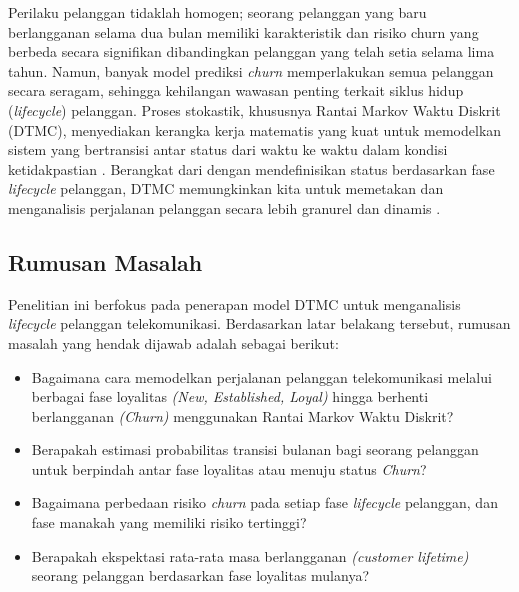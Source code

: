\documentclass[a4paper,12pt]{article}
\begin{document}
Perilaku pelanggan tidaklah homogen; seorang pelanggan yang baru berlangganan selama dua bulan memiliki karakteristik dan risiko churn yang berbeda secara signifikan dibandingkan pelanggan yang telah setia selama lima tahun. Namun, banyak model prediksi \textit{churn} memperlakukan semua pelanggan secara seragam, sehingga kehilangan wawasan penting terkait siklus hidup (\textit{lifecycle}) pelanggan. Proses stokastik, khususnya Rantai Markov Waktu Diskrit (DTMC), menyediakan kerangka kerja matematis yang kuat untuk memodelkan sistem yang bertransisi antar status dari waktu ke waktu dalam kondisi ketidakpastian \citep{ross2014introduction}. Berangkat dari \citep{pfeifer2002customer} dengan mendefinisikan status berdasarkan fase \textit{lifecycle} pelanggan, DTMC memungkinkan kita untuk memetakan dan menganalisis perjalanan pelanggan secara lebih granurel \citep{grimmett2001probability} dan dinamis \citep{gusev2019markov}.

\subsection{Rumusan Masalah}
Penelitian ini berfokus pada penerapan model DTMC untuk menganalisis \textit{lifecycle} pelanggan telekomunikasi. Berdasarkan latar belakang tersebut, rumusan masalah yang hendak dijawab adalah sebagai berikut:
\begin{itemize}
    \item Bagaimana cara memodelkan perjalanan pelanggan telekomunikasi melalui berbagai fase loyalitas \textit{(New, Established, Loyal)} hingga berhenti berlangganan \textit{(Churn)} menggunakan Rantai Markov Waktu Diskrit?
    \item Berapakah estimasi probabilitas transisi bulanan bagi seorang pelanggan untuk berpindah antar fase loyalitas atau menuju status \textit{Churn}?
    \item Bagaimana perbedaan risiko \textit{churn} pada setiap fase \textit{lifecycle} pelanggan, dan fase manakah yang memiliki risiko tertinggi?
    \item Berapakah ekspektasi rata-rata masa berlangganan \textit{(customer lifetime)} seorang pelanggan berdasarkan fase loyalitas mulanya?
\end{itemize}
\end{document}
